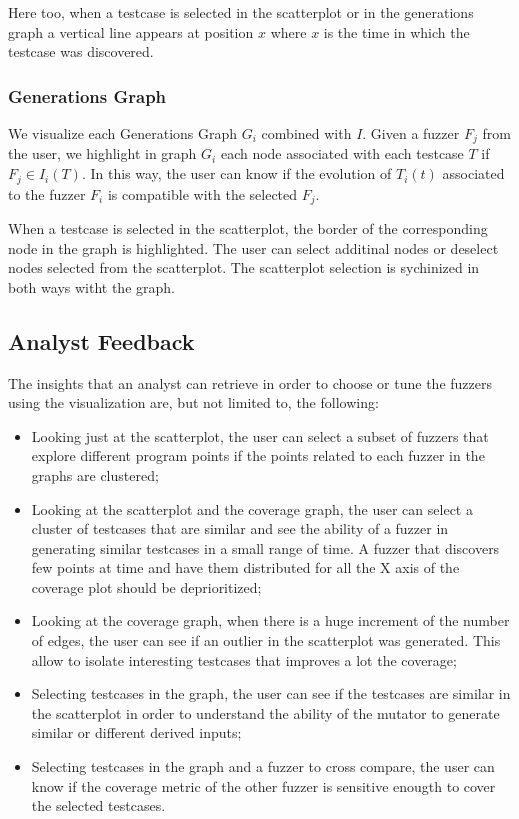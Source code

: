 \documentclass[conference,compsoc]{IEEEtran}
\begin{document}
Here too, when a testcase is selected in the scatterplot or in the generations graph a vertical line appears at position $x$ where $x$ is the time in which the testcase was discovered.

\subsubsection{Generations Graph}

We visualize each Generations Graph $G_i$ combined with $I$. Given a fuzzer $F_j$ from the user, we highlight in graph $G_i$ each node associated with each testcase $T$ if $F_j \in I_i(T)$. In this way, the user can know if the evolution of $T_i(t)$ associated to the fuzzer $F_i$ is compatible with the selected $F_j$.

When a testcase is selected in the scatterplot, the border of the corresponding node in the graph is highlighted. The user can select additinal nodes or deselect nodes selected from the scatterplot. The scatterplot selection is sychinized in both ways witht the graph.

\subsection{Analyst Feedback}

The insights that an analyst can retrieve in order to choose or tune the fuzzers using the visualization are, but not limited to, the following:

\begin{itemize}
\item Looking just at the scatterplot, the user can select a subset of fuzzers that explore different program points if the points related to each fuzzer in the graphs are clustered;
\item Looking at the scatterplot and the coverage graph, the user can select a cluster of testcases that are similar and see the ability of a fuzzer in generating similar testcases in a small range of time. A fuzzer that discovers few points at time and have them distributed for all the X axis of the coverage plot should be deprioritized;
\item Looking at the coverage graph, when there is a huge increment of the number of edges, the user can see if an outlier in the scatterplot was generated. This allow to isolate interesting testcases that improves a lot the coverage;
\item Selecting testcases in the graph, the user can see if the testcases are similar in the scatterplot in order to understand the ability of the mutator to generate similar or different derived inputs;
\item Selecting testcases in the graph and a fuzzer to cross compare, the user can know if the coverage metric of the other fuzzer is sensitive enougth to cover the selected testcases.
\end{itemize}
\end{document}
